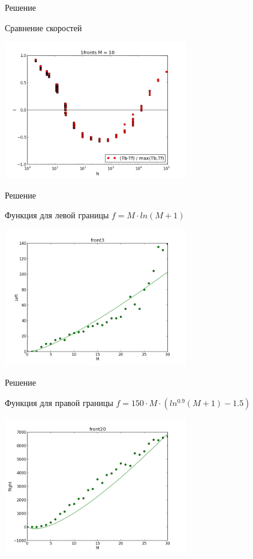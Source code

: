 \documentclass{beamer}
\begin{document}
\begin{frame}{Решение}
\begin{block}{Сравнение скоростей}
\begin{center}
\includegraphics*[height=6cm]{pic/bos_fast.png}
\end{center}
\end{block}
\end{frame}


\begin{frame}{Решение}
\begin{block}{Функция для левой границы}
$f = M \cdot ln(M + 1)$
\begin{center}
\includegraphics*[height=6cm]{pic/left.png}
\end{center}

\end{block}
\end{frame}


\begin{frame}{Решение}
\begin{block}{Функция для правой границы}
$f = 150 \cdot M \cdot (ln^{0.9}(M + 1) - 1.5)$
\begin{center}
\includegraphics*[height=6cm]{pic/right.png}
\end{center}
\end{block}
\end{frame}
\end{document}
